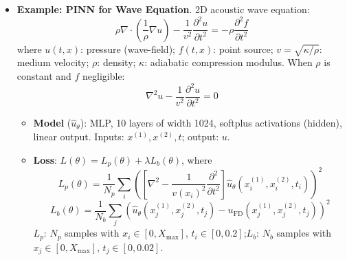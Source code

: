 \documentclass[UTF8]{ctexart}
\begin{document}
\begin{itemize}
    \item \textbf{Example: PINN for Wave Equation}. 2D acoustic wave equation:
    \[
        \rho\nabla\cdot\!\left(\frac{1}{\rho}\nabla u\right) - \frac{1}{v^2}\frac{\partial^2 u}{\partial t^2} = -\rho\frac{\partial^2 f}{\partial t^2}
    \]
    where $u(t,x)$: pressure (wave-field); $f(t,x)$: point source; $v=\sqrt{\kappa/\rho}$: medium velocity; $\rho$: density; $\kappa$: adiabatic compression modulus. When $\rho$ is constant and $f$ negligible:
    \[
        \nabla^2 u - \frac{1}{v^2}\frac{\partial^2 u}{\partial t^2} = 0
    \]
    \begin{itemize}
        \item \textbf{Model} ($\hat{u}_\theta$): MLP, 10 layers of width 1024, softplus activations (hidden), linear output. Inputs: $x^{(1)}, x^{(2)}, t$; output: $u$.
        \item \textbf{Loss}: $L(\theta) = L_p(\theta) + \lambda L_b(\theta)$, where
        \[
            L_p(\theta) = \frac{1}{N_p}\sum_{i}\left(\left[\nabla^2 - \frac{1}{v(x_i)^2}\frac{\partial^2}{\partial t^2}\right]\hat{u}_\theta\!\left(x_i^{(1)},x_i^{(2)},t_i\right)\right)^{\!2}
        \]
        \[
            L_b(\theta) = \frac{1}{N_b}\sum_{j}\left(\hat{u}_\theta\!\left(x_j^{(1)},x_j^{(2)},t_j\right) - u_{\mathrm{FD}}\!\left(x_j^{(1)},x_j^{(2)},t_j\right)\right)^{\!2}
        \]
        $L_p$: $N_p$ samples with $x_i\in[0,X_{\max}]$, $t_i\in[0,0.2]$;\quad $L_b$: $N_b$ samples with $x_j\in[0,X_{\max}]$, $t_j\in[0,0.02]$.
    \end{itemize}
\end{itemize}
\end{document}
